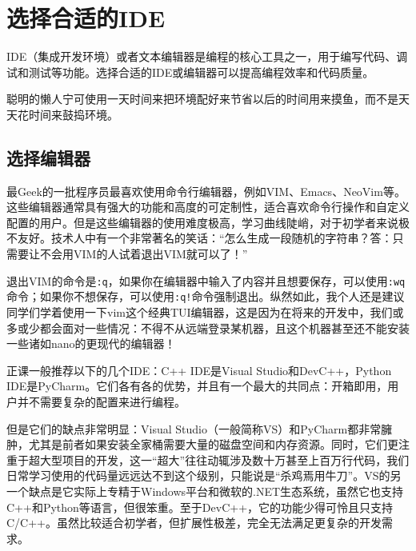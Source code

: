 \documentclass[../main.tex]{subfiles}
\begin{document}
\section{选择合适的IDE}

IDE（集成开发环境）或者文本编辑器是编程的核心工具之一，用于编写代码、调试和测试等功能。选择合适的IDE或编辑器可以提高编程效率和代码质量。

聪明的懒人宁可使用一天时间来把环境配好来节省以后的时间用来摸鱼，而不是天天花时间来鼓捣环境。

\subsection{选择编辑器}

最Geek的一批程序员最喜欢使用命令行编辑器，例如VIM、Emacs、NeoVim等。这些编辑器通常具有强大的功能和高度的可定制性，适合喜欢命令行操作和自定义配置的用户。但是这些编辑器的使用难度极高，学习曲线陡峭，对于初学者来说极不友好。技术人中有一个非常著名的笑话：“怎么生成一段随机的字符串？答：只需要让不会用VIM的人试着退出VIM就可以了！”

\begin{tip}
  退出VIM的命令是\texttt{:q}，如果你在编辑器中输入了内容并且想要保存，可以使用\texttt{:wq}命令；如果你不想保存，可以使用\texttt{:q!}命令强制退出。纵然如此，我个人还是建议同学们学着使用一下vim这个经典TUI编辑器，这是因为在将来的开发中，我们或多或少都会面对一些情况：不得不从远端登录某机器，且这个机器甚至还不能安装一些诸如nano的更现代的编辑器！
\end{tip}

正课一般推荐以下的几个IDE：C++ IDE是Visual Studio和DevC++，Python IDE是PyCharm。它们各有各的优势，并且有一个最大的共同点：开箱即用，用户并不需要复杂的配置来进行编程。

但是它们的缺点非常明显：Visual Studio（一般简称VS）和PyCharm都非常臃肿，尤其是前者如果安装全家桶需要大量的磁盘空间和内存资源。同时，它们更注重于超大型项目的开发，这一“超大”往往动辄涉及数十万甚至上百万行代码，我们日常学习使用的代码量远远达不到这个级别，只能说是“杀鸡焉用牛刀”。VS的另一个缺点是它实际上专精于Windows平台和微软的.NET生态系统，虽然它也支持C++和Python等语言，但很笨重。至于DevC++，它的功能少得可怜且只支持C/C++。虽然比较适合初学者，但扩展性极差，完全无法满足更复杂的开发需求。
\end{document}
